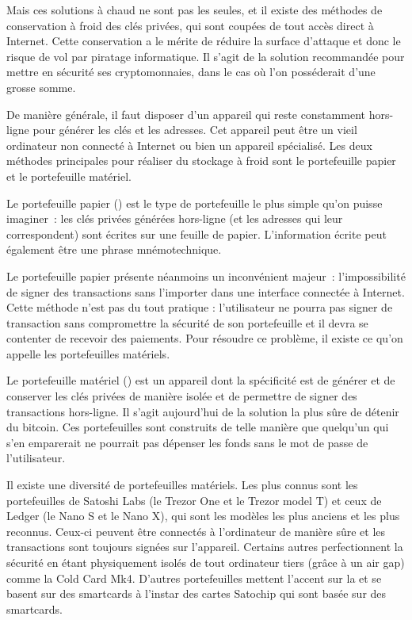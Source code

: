 
Mais ces solutions à chaud ne sont pas les seules, et il existe des méthodes de conservation à froid des clés privées, qui sont coupées de tout accès direct à Internet. Cette conservation a le mérite de réduire la surface d'attaque et donc le risque de vol par piratage informatique. Il s'agit de la solution recommandée pour mettre en sécurité ses cryptomonnaies, dans le cas où l'on posséderait d'une grosse somme.

De manière générale, il faut disposer d'un appareil qui reste constamment hors-ligne pour générer les clés et les adresses. Cet appareil peut être un vieil ordinateur non connecté à Internet ou bien un appareil spécialisé. Les deux méthodes principales pour réaliser du stockage à froid sont le portefeuille papier et le portefeuille matériel.

Le portefeuille papier () est le type de portefeuille le plus simple qu'on puisse imaginer~: les clés privées générées hors-ligne (et les adresses qui leur correspondent) sont écrites sur une feuille de papier. L'information écrite peut également être une phrase mnémotechnique.

Le portefeuille papier présente néanmoins un inconvénient majeur~: l'impossibilité de signer des transactions sans l'importer dans une interface connectée à Internet. Cette méthode n'est pas du tout pratique : l'utilisateur ne pourra pas signer de transaction sans compromettre la sécurité de son portefeuille et il devra se contenter de recevoir des paiements. Pour résoudre ce problème, il existe ce qu'on appelle les portefeuilles matériels.

Le portefeuille matériel () est un appareil dont la spécificité est de générer et de conserver les clés privées de manière isolée et de permettre de signer des transactions hors-ligne. Il s'agit aujourd'hui de la solution la plus sûre de détenir du bitcoin. Ces portefeuilles sont construits de telle manière que quelqu'un qui s'en emparerait ne pourrait pas dépenser les fonds sans le mot de passe de l'utilisateur.

Il existe une diversité de portefeuilles matériels. Les plus connus sont les portefeuilles de Satoshi Labs (le Trezor One et le Trezor model T) et ceux de Ledger (le Nano S et le Nano X), qui sont les modèles les plus anciens et les plus reconnus. Ceux-ci peuvent être connectés à l'ordinateur de manière sûre et les transactions sont toujours signées sur l'appareil. Certains autres perfectionnent la sécurité en étant physiquement isolés de tout ordinateur tiers (grâce à un air gap) comme la Cold Card Mk4. D'autres portefeuilles mettent l'accent sur la  et se basent sur des smartcards à l'instar des cartes Satochip qui sont basée sur des smartcards. 

